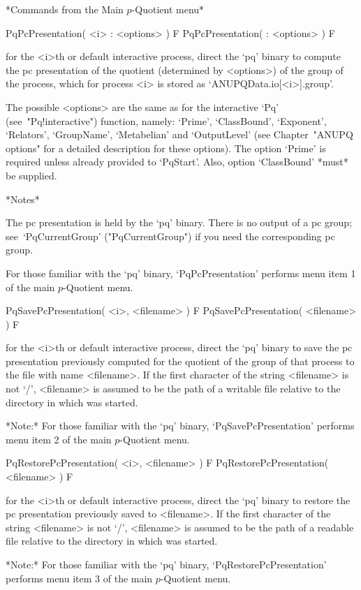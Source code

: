 *Commands from the Main $p$-Quotient menu*

\>PqPcPresentation( <i> : <options> ) F
\>PqPcPresentation( : <options> ) F

for the <i>th or default interactive {\ANUPQ} process,  direct  the  `pq'
binary to compute the pc presentation  of  the  quotient  (determined  by
<options>) of the group of the process, which for process <i>  is  stored
as `ANUPQData.io[<i>].group'.

The  possible  <options>  are  the  same  as  for  the  interactive  `Pq'
(see~"Pq!interactive")   function,   namely:    `Prime',    `ClassBound',
`Exponent', `Relators', `GroupName', `Metabelian' and `OutputLevel'  (see
Chapter~"ANUPQ options" for a detailed description  for  these  options).
The option `Prime' is required  unless  already  provided  to  `PqStart'.
Also, option `ClassBound' *must* be supplied.

*Notes* 

The pc presentation is held by the `pq' binary. There is no output  of  a
{\GAP} pc group; see~`PqCurrentGroup' ("PqCurrentGroup") if you need  the
corresponding {\GAP} pc group.

For those familiar with the `pq' binary, `PqPcPresentation' performs menu
item 1 of the main $p$-Quotient menu.

\>PqSavePcPresentation( <i>, <filename> ) F
\>PqSavePcPresentation( <filename> ) F

for the <i>th or default interactive {\ANUPQ} process,  direct  the  `pq'
binary to save the pc presentation previously computed for  the  quotient
of the group of that process to the file with  name  <filename>.  If  the
first character of the  string  <filename>  is  not  `/',  <filename>  is
assumed to be the path of a writable file relative to  the  directory  in
which {\GAP} was started.

*Note:* For those familiar with the `pq'  binary,  `PqSavePcPresentation'
performs menu item 2 of the main $p$-Quotient menu.

\>PqRestorePcPresentation( <i>, <filename> ) F
\>PqRestorePcPresentation( <filename> ) F

for the <i>th or default interactive {\ANUPQ} process,  direct  the  `pq'
binary to restore the pc presentation previously saved to <filename>.  If
the first character of the string <filename> is not  `/',  <filename>  is
assumed to be the path of a readable file relative to  the  directory  in
which {\GAP} was started.

*Note:*
For  those  familiar  with  the  `pq'  binary,  `PqRestorePcPresentation'
performs menu item 3 of the main $p$-Quotient menu.

